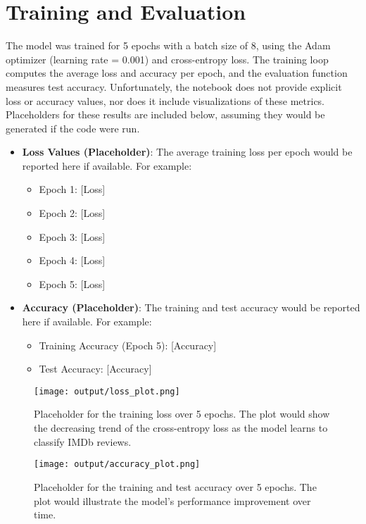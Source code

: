 \documentclass{article}
\begin{document}
\section{Training and Evaluation}
The model was trained for 5 epochs with a batch size of 8, using the Adam optimizer (learning rate = 0.001) and cross-entropy loss. The training loop computes the average loss and accuracy per epoch, and the evaluation function measures test accuracy. Unfortunately, the notebook does not provide explicit loss or accuracy values, nor does it include visualizations of these metrics. Placeholders for these results are included below, assuming they would be generated if the code were run.

\begin{itemize}
    \item \textbf{Loss Values (Placeholder)}: The average training loss per epoch would be reported here if available. For example:
    \begin{itemize}
        \item Epoch 1: [Loss]
        \item Epoch 2: [Loss]
        \item Epoch 3: [Loss]
        \item Epoch 4: [Loss]
        \item Epoch 5: [Loss]
    \end{itemize}
    \item \textbf{Accuracy (Placeholder)}: The training and test accuracy would be reported here if available. For example:
    \begin{itemize}
        \item Training Accuracy (Epoch 5): [Accuracy]
        \item Test Accuracy: [Accuracy]
    \end{itemize}
\end{itemize}

\begin{figure}[h]
    \centering
    \texttt{[image: output/loss\_plot.png]}
    \caption{Placeholder for the training loss over 5 epochs. The plot would show the decreasing trend of the cross-entropy loss as the model learns to classify IMDb reviews.}
    \label{fig:loss_plot}
\end{figure}

\begin{figure}[h]
    \centering
    \texttt{[image: output/accuracy\_plot.png]}
    \caption{Placeholder for the training and test accuracy over 5 epochs. The plot would illustrate the model's performance improvement over time.}
    \label{fig:accuracy_plot}
\end{figure}
\end{document}
